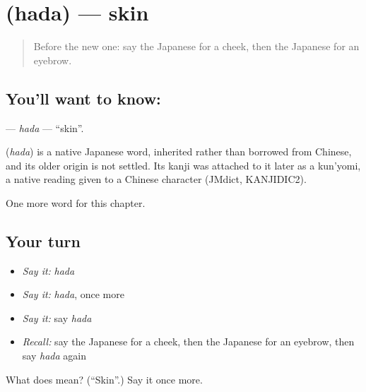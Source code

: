 \section[\texorpdfstring{\ja{はだ} (hada)}{はだ (hada)}]{ (hada) — skin}

\label{lesson:JA-C21-hada}



\begin{quote}
Before the new one: say the Japanese for a cheek, then the Japanese for an eyebrow.
\end{quote}

\subsection*{You'll want to know: }
\textbf{} — \emph{hada} — \textquotedblleft{}skin\textquotedblright{}.

\begin{cousinweb}
\textbf{} (\emph{hada}) is a native Japanese word, inherited rather than borrowed from Chinese, and its older origin is not settled. Its kanji was attached to it later as a kun'yomi, a native reading given to a Chinese character (JMdict, KANJIDIC2).
\end{cousinweb}

\begin{grammarlens}[title={What you've built}]
One more word for this chapter.
\end{grammarlens}

\subsection*{Your turn}
\begin{itemize}
\raggedright
  \item \emph{Say it:} \emph{hada}
  \item \emph{Say it:} \emph{hada}, once more
  \item \emph{Say it:} say \emph{hada}
  \item \emph{Recall:} say the Japanese for a cheek, then the Japanese for an eyebrow, then say \emph{hada} again
\end{itemize}

\begin{tcolorbox}[breakable,colback=teal!4,colframe=teal!35!black,title={Before you move on}]
What does  mean? (\textquotedblleft{}Skin\textquotedblright{}.) Say it once more.
\end{tcolorbox}
